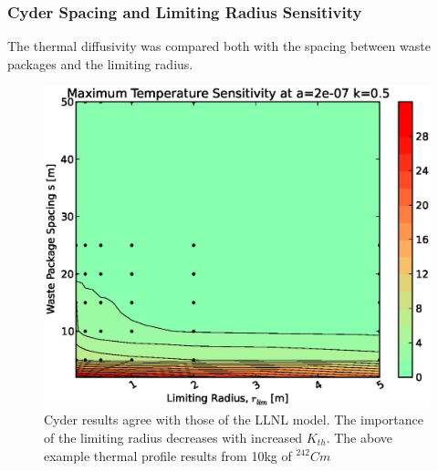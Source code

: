 \begin{frame}[ctb!]
\frametitle{Cyder Spacing and Limiting Radius Sensitivity}
The thermal diffusivity was compared both with the 
spacing between waste packages and the limiting radius. 

\begin{figure}[htbp!]
\begin{center}
\includegraphics[height=0.7\textheight]{./thermal_demonstration/spacing/rs.eps}
\end{center}
\caption[$\alpha_{th}$ vs. $r_{lim}$ Sensitivity in Cyder]
{Cyder results agree with 
those of the LLNL model. The importance of the limiting radius decreases with 
increased $K_{th}$. The above example thermal profile results from 10kg of 
$^{242}Cm$}
\label{fig:rs}
\end{figure}

\end{frame}
